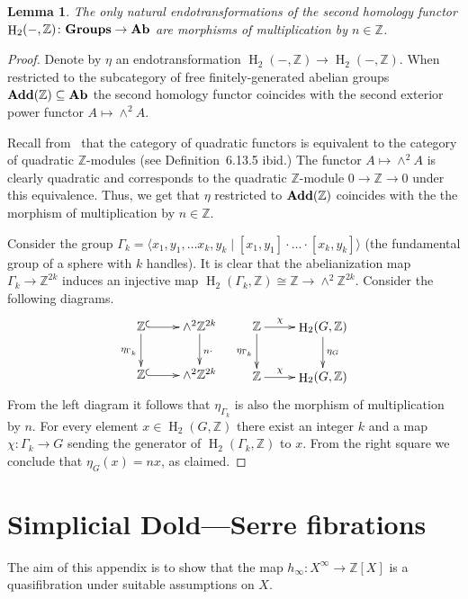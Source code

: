 \documentclass[oneside, 12pt]{amsart}
\theoremstyle{plain}
\numberwithin{equation}{section}
\newtheorem{lemma}{Lemma}
\numberwithin{lemma}{section}
\theoremstyle{remark}
\theoremstyle{definition}
\newcommand{\catname}[1]{{\normalfont\textbf{#1}}}
\DeclareMathOperator{\HH}{H}
\newcommand{\ZZ}{\mathbb{Z}}
\begin{document}
\begin{lemma} \label{lm:endotr} The only natural endotransformations of the second homology functor $\HH_2(-, \ZZ)\colon \catname{Groups}\to \catname{Ab}$ 
 are morphisms of multiplication by $n \in \ZZ$.
\end{lemma}
\begin{proof}
 Denote by $\eta$ an endotransformation $\HH_2(-, \ZZ) \to \HH_2(-, \ZZ)$.
 When restricted to the subcategory of free finitely-generated abelian groups $\catname{Add}(\ZZ) \subseteq \catname{Ab}$ the second homology functor
 coincides with the second exterior power functor $A \mapsto \wedge^2A$. 
 
 Recall from~\cite[Theorem~6.13.12]{Ba96} that the category of quadratic functors is equivalent to the category of quadratic $\ZZ$-modules (see Definition~6.13.5 ibid.)
 The functor $A \mapsto \wedge^2A$ is clearly quadratic and corresponds to the quadratic $\ZZ$-module $0 \to \ZZ \to 0$ under this equivalence.
 Thus, we get that $\eta$ restricted to $\catname{Add}(\ZZ)$ coincides with the the morphism of multiplication by $n\in \ZZ$.
 
 Consider the group $\Gamma_k = \langle x_1, y_1, \ldots x_k, y_k \mid [x_1, y_1]\cdot \ldots \cdot [x_k, y_k] \rangle$ (the fundamental group of a sphere with $k$ handles).
 It is clear that the abelianization map $\Gamma_k \to \ZZ^{2k}$ induces an injective map $\HH_2(\Gamma_k, \ZZ) \cong \ZZ \to \wedge^2\ZZ^{2k}$.  
 Consider the following diagrams.
  \[ \xymatrix{ \ZZ \ar@{^{(}->}[r] \ar[d]_{\eta_{\Gamma_k}} & \ar[d]^{n \cdot} \wedge^2\ZZ^{2k} \\
                \ZZ \ar@{^{(}->}[r]                          & \wedge^2\ZZ^{2k} } \ \ \ 
     \xymatrix{   \ZZ  \ar[r]^(.35){\chi} \ar[d]_{\eta_{\Gamma_k}} & \ar[d]^{\eta_G} \HH_2(G, \ZZ) \\
                  \ZZ  \ar[r]^(.35){\chi}                          & \HH_2(G, \ZZ)}  \]
 From the left diagram it follows that $\eta_{\Gamma_k}$ is also the morphism of multiplication by $n$.
 For every element $x\in \HH_2(G, \ZZ)$ there exist an integer $k$ and a map $\chi\colon \Gamma_k\to G$ sending the generator of $\HH_2(\Gamma_k, \ZZ)$ to $x$.
 From the right square we conclude that $\eta_G(x) = nx$, as claimed.
\end{proof}

\appendix\section{Simplicial Dold---Serre fibrations}
The aim of this appendix is to show that the map $h_\infty\colon X^{\infty}\to \ZZ[X]$ is a quasifibration under suitable assumptions on $X$.
\end{document}

